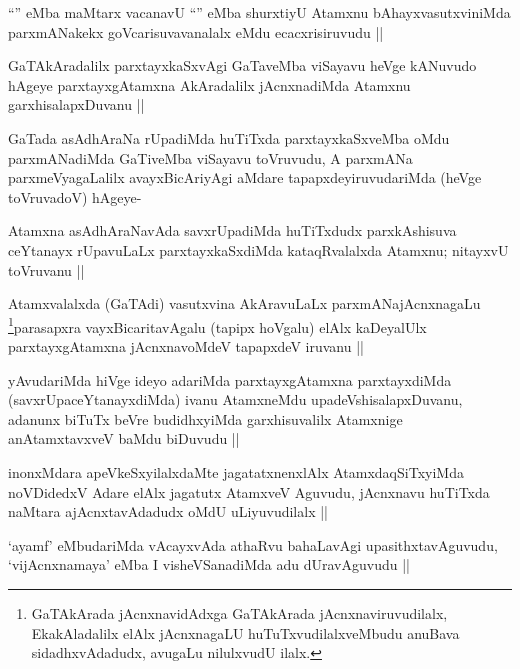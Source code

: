 \begin{artha}
``\stext'' eMba maMtarx vacanavU ``\stext'' eMba shurxtiyU Atamxnu bAhayxvasutxviniMda parxmANakekx goVcarisuvavanalalx eMdu ecacxrisiruvudu ||
\end{artha}

\begin{artha}
GaTAkAradalilx parxtayxkaSxvAgi GaTaveMba viSayavu heVge kANuvudo hAgeye parxtayxgAtamxna AkAradalilx jAcnxnadiMda Atamxnu garxhisalapxDuvanu ||
\end{artha}

\begin{artha}
GaTada asAdhAraNa rUpadiMda huTiTxda parxtayxkaSxveMba oMdu parxmANadiMda GaTiveMba viSayavu toVruvudu, A parxmANa parxmeVyagaLalilx avayxBicAriyAgi aMdare tapapxdeyiruvudariMda (heVge toVruvadoV) hAgeye-
\end{artha}

\begin{artha}
Atamxna asAdhAraNavAda savxrUpadiMda huTiTxdudx parxkAshisuva ceYtanayx rUpavuLaLx parxtayxkaSxdiMda kataqRvalalxda Atamxnu; nitayxvU toVruvanu ||
\end{artha}

\begin{artha}
Atamxvalalxda (GaTAdi) vasutxvina AkAravuLaLx parxmANajAcnxnagaLu \footnote{GaTAkArada jAcnxnavidAdxga GaTAkArada jAcnxnaviruvudilalx, EkakAladalilx elAlx jAcnxnagaLU huTuTxvudilalxveMbudu anuBava sidadhxvAdadudx, avugaLu nilulxvudU ilalx.}parasapxra vayxBicaritavAgalu (tapipx hoVgalu) elAlx kaDeyalUlx parxtayxgAtamxna jAcnxnavoMdeV tapapxdeV iruvanu ||
\end{artha}

\begin{artha}
yAvudariMda hiVge ideyo adariMda parxtayxgAtamxna parxtayxdiMda (savxrUpaceYtanayxdiMda) ivanu AtamxneMdu upadeVshisalapxDuvanu, adanunx biTuTx beVre budidhxyiMda garxhisuvalilx Atamxnige anAtamxtavxveV baMdu biDuvudu ||
\end{artha}

\begin{artha}
inonxMdara apeVkeSxyilalxdaMte jagatatxnenxlAlx AtamxdaqSiTxyiMda noVDidedxV Adare elAlx jagatutx AtamxveV Aguvudu, jAcnxnavu huTiTxda naMtara ajAcnxtavAdadudx oMdU uLiyuvudilalx ||
\end{artha}

\begin{artha}
`ayamf' eMbudariMda vAcayxvAda athaRvu bahaLavAgi upasithxtavAguvudu, `vijAcnxnamaya' eMba I visheVSanadiMda adu dUravAguvudu ||
\end{artha}

